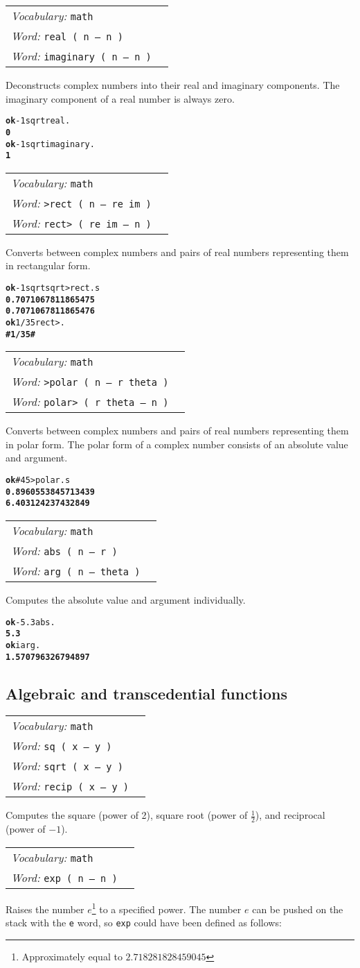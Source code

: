 \documentclass{book}
\newcommand{\tto}{\symbol{123}}
\newcommand{\ttc}{\symbol{125}}
\newcommand{\vocabulary}[1]{\emph{Vocabulary:} \texttt{#1}&\\}
\newcommand{\ordinaryword}[2]{\index{\texttt{#1}}\emph{Word:} \texttt{#2}&\\}
\newcommand{\wordtable}[1]{


\begin{tabularx}{12cm}{lX}
\hline
#1
\hline
\end{tabularx}

}
\begin{document}
\wordtable{
\vocabulary{math}
\ordinaryword{real}{real ( n -- n )}
\ordinaryword{imaginary}{imaginary ( n -- n )}
}
Deconstructs complex numbers into their real and imaginary components. The imaginary component of a real number is always zero.
\begin{alltt}
\textbf{ok} -1 sqrt real .
\textbf{0}
\textbf{ok} -1 sqrt imaginary .
\textbf{1}
\end{alltt}
\wordtable{
\vocabulary{math}
\ordinaryword{>rect}{>rect ( n -- re im )}
\ordinaryword{rect>}{rect> ( re im -- n )}
}
Converts between complex numbers and pairs of real numbers representing them in rectangular form.
\begin{alltt}
\textbf{ok} -1 sqrt sqrt >rect .s
\textbf{0.7071067811865475
0.7071067811865476}
\textbf{ok} 1/3 5 rect> .
\textbf{\#\tto 1/3 5 \ttc\#}
\end{alltt}

\wordtable{
\vocabulary{math}
\ordinaryword{>polar}{>polar ( n -- r theta )}
\ordinaryword{polar>}{polar> ( r theta -- n )}
}
Converts between complex numbers and pairs of real numbers representing them in polar form. The polar form of a complex number consists of an absolute value and argument.
\begin{alltt}
\textbf{ok} \#\tto 4 5 \ttc >polar .s
\textbf{0.8960553845713439
6.403124237432849}
\end{alltt}

\wordtable{
\vocabulary{math}
\ordinaryword{abs}{abs ( n -- r )}
\ordinaryword{arg}{arg ( n -- theta )}

}
Computes the absolute value and argument individually.
\begin{alltt}
\textbf{ok} -5.3 abs .
\textbf{5.3}
\textbf{ok} i arg .
\textbf{1.570796326794897}
\end{alltt}

\subsection{\label{algebraic}Algebraic and transcedential functions}

\wordtable{
\vocabulary{math}
\ordinaryword{sq}{sq ( x -- y )}
\ordinaryword{sqrt}{sqrt ( x -- y )}
\ordinaryword{recip}{recip ( x -- y )}
}
Computes the square (power of 2), square root (power of $\frac{1}{2}$), and reciprocal (power of $-1$).
\wordtable{
\vocabulary{math}
\ordinaryword{exp}{exp ( n -- n )}
}
Raises the number $e$\footnote{Approximately equal to $2.718281828459045$} to a specified power. The number $e$ can be pushed on the stack with the \texttt{e} word, so \texttt{exp} could have been defined as follows:
\end{document}

